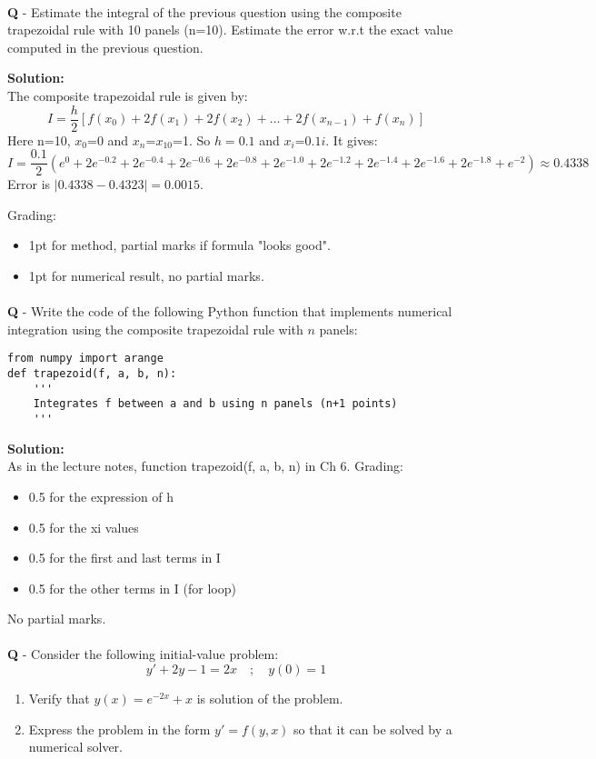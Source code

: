 \documentclass{llncs}
\newcounter{ques}
\renewcommand{\question}[1]{\paragraph{}\textbf{Q\theques} - #1\stepcounter{ques} }
\newcommand{\answer}[1]{\color{red}\textbf{Solution:}\\#1\color{black}}
\begin{document}
\newpage
\question{Estimate the integral of the previous question using the composite trapezoidal rule with 10 panels (n=10). Estimate the error w.r.t the exact value
computed in the previous question.}

\answer{The composite trapezoidal rule is given by:
$$
I = \frac{h}{2}\left[f(x_0) + 2f(x_1) + 2f(x_2) + \ldots + 2f(x_{n-1}) + f(x_n)\right]
$$
Here n=10, $x_0$=0 and $x_n$=$x_{10}$=1. So $h=0.1$ and $x_i$=$0.1i$.
It gives:
$$
I = \frac{0.1}{2}\left( e^{0} + 2e^{-0.2} + 2e^{-0.4} + 2e^{-0.6} + 2 e^{-0.8} + 2e^{-1.0} + 2e^{-1.2} + 2e^{-1.4} + 2e^{-1.6} + 2e^{-1.8} + e^{-2} \right)
  \approx 0.4338
$$
Error is $|0.4338-0.4323|=0.0015$.

Grading:
\begin{itemize}
\item 1pt for method, partial marks if formula "looks good".
\item 1pt for numerical result, no partial marks.
\end{itemize}
}

\newpage
\question{Write the code of the following Python function that implements numerical integration using the composite trapezoidal rule with $n$ panels:}
\begin{verbatim}
from numpy import arange
def trapezoid(f, a, b, n):
    '''
    Integrates f between a and b using n panels (n+1 points)
    '''
\end{verbatim}

\vspace*{2cm}
\answer{As in the lecture notes, function trapezoid(f, a, b, n) in Ch 6.
Grading:
\begin{itemize}
\item 0.5 for the expression of h
\item 0.5 for the xi values
\item 0.5 for the first and last terms in I
\item 0.5 for the other terms in I (for loop)
\end{itemize}
No partial marks.
}

\newpage
\question{Consider the following initial-value problem:
$$
y'+2y-1=2x \quad ; \quad y(0)=1
$$
\begin{enumerate}
\item Verify that $y(x) = e^{-2x} + x$ is solution of the problem.
\item Express the problem in the form $y'=f(y, x)$ so that it can be solved by a numerical solver.
\end{enumerate}
}
\end{document}
